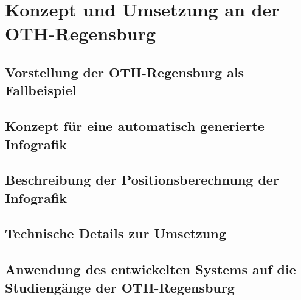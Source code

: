\section{Konzept und Umsetzung an der OTH-Regensburg}

\subsection{Vorstellung der OTH-Regensburg als Fallbeispiel}

\subsection{Konzept für eine automatisch generierte Infografik}

\subsection{Beschreibung der Positionsberechnung der Infografik}

\subsection{Technische Details zur Umsetzung}

\subsection{Anwendung des entwickelten Systems auf die Studiengänge der OTH-Regensburg}